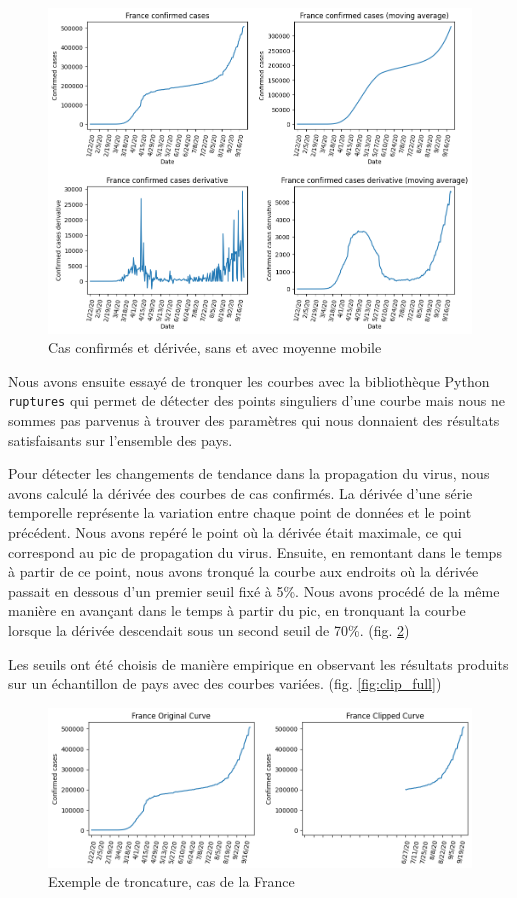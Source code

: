 \documentclass[12pt]{iEEEtran}
\begin{document}
\begin{figure}[h]
    \centering
    \includegraphics[width=\columnwidth]{img/moving_avg.png}
    \caption{Cas confirmés et dérivée, sans et avec moyenne mobile}
    \label{fig:moving_avg}
\end{figure}

Nous avons ensuite essayé de tronquer les courbes avec la bibliothèque Python \texttt{ruptures} qui
permet de détecter des points singuliers d'une courbe mais nous ne sommes pas parvenus à trouver
des paramètres qui nous donnaient des résultats satisfaisants sur l'ensemble des pays.

Pour détecter les changements de tendance dans la propagation du virus, nous avons calculé la dérivée
des courbes de cas confirmés. La dérivée d'une série temporelle représente la variation entre chaque point
de données et le point précédent. Nous avons repéré le point où la dérivée était maximale, ce qui
correspond au pic de propagation du virus. Ensuite, en remontant dans le temps à partir de ce point,
nous avons tronqué la courbe aux endroits où la dérivée passait en dessous d'un premier seuil fixé à 5\%.
Nous avons procédé de la même manière en avançant dans le temps à partir du pic, en tronquant la courbe
lorsque la dérivée descendait sous un second seuil de 70\%. (fig. \ref{fig:clip})

Les seuils ont été choisis de manière empirique en observant les résultats produits sur un échantillon de pays
avec des courbes variées. (fig. \ref{fig:clip_full})

\begin{figure}[h]
    \centering
    \includegraphics[width=\columnwidth]{img/clip.png}
    \caption{Exemple de troncature, cas de la France}
    \label{fig:clip}
\end{figure}
\end{document}
